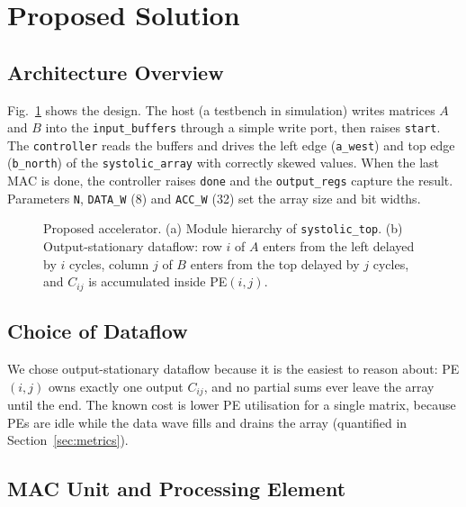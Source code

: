 \documentclass[conference,a4paper]{IEEEtran}
\begin{document}
\section{Proposed Solution}

\subsection{Architecture Overview}
Fig.~\ref{fig:arch} shows the design. The host (a testbench in simulation) writes matrices $A$ and $B$ into the \texttt{input\_buffers} through a simple write port, then raises \texttt{start}. The \texttt{controller} reads the buffers and drives the left edge (\texttt{a\_west}) and top edge (\texttt{b\_north}) of the \texttt{systolic\_array} with correctly skewed values. When the last MAC is done, the controller raises \texttt{done} and the \texttt{output\_regs} capture the result. Parameters \texttt{N}, \texttt{DATA\_W} (8) and \texttt{ACC\_W} (32) set the array size and bit widths.

\begin{figure}[t]
\centering
{}
\caption{Proposed accelerator. (a) Module hierarchy of \texttt{systolic\_top}. (b) Output-stationary dataflow: row $i$ of $A$ enters from the left delayed by $i$ cycles, column $j$ of $B$ enters from the top delayed by $j$ cycles, and $C_{ij}$ is accumulated inside PE$(i,j)$.}
\label{fig:arch}
\end{figure}

\subsection{Choice of Dataflow}
We chose output-stationary dataflow because it is the easiest to reason about: PE$(i,j)$ owns exactly one output $C_{ij}$, and no partial sums ever leave the array until the end. The known cost is lower PE utilisation for a single matrix, because PEs are idle while the data wave fills and drains the array (quantified in Section~\ref{sec:metrics}).

\subsection{MAC Unit and Processing Element}
\end{document}
